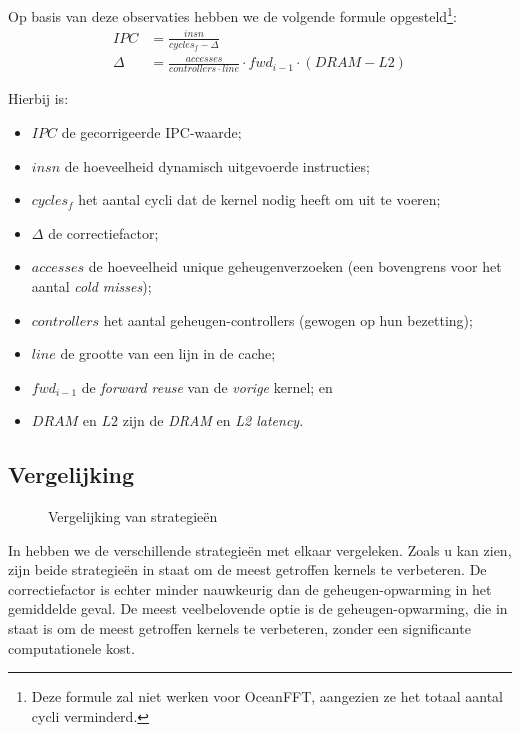 \documentclass[5p,numvwe]{elsarticle}
\begin{document}
    Op basis van deze observaties hebben we de volgende formule opgesteld\footnote{Deze formule zal niet werken voor OceanFFT, aangezien ze het totaal aantal cycli verminderd.}:
    \begin{align}
        IPC &= \frac{insn}{cycles_f - \Delta} \\
        \Delta &= \frac{accesses}{controllers \cdot line} \cdot fwd_{i-1} \cdot (DRAM - L2)
    \end{align}

    Hierbij is:
    \begin{itemize}
        \item $IPC$ de gecorrigeerde IPC-waarde;
        \item $insn$ de hoeveelheid dynamisch uitgevoerde instructies;
        \item $cycles_f$ het aantal cycli dat de kernel nodig heeft om uit te voeren;
        \item $\Delta$ de correctiefactor;
        \item $accesses$ de hoeveelheid unique geheugenverzoeken (een bovengrens voor het aantal \textit{cold misses});
        \item $controllers$ het aantal geheugen-controllers (gewogen op hun bezetting);
        \item $line$ de grootte van een lijn in de cache;
        \item $fwd_{i-1}$ de \textit{forward reuse} van de \textit{vorige} kernel; en
        \item $DRAM$ en $L2$ zijn de \textit{DRAM} en \textit{L2 latency}.
    \end{itemize}

    \subsection{Vergelijking}\label{subsec:inp-vergelijk}
    \begin{figure}[hb]
        \centering
        \caption{Vergelijking van strategieën}
        \label{fig:mitig-compare}
    \end{figure}

    In  hebben we de verschillende strategieën met elkaar vergeleken.
    Zoals u kan zien, zijn beide strategieën in staat om de meest getroffen kernels te verbeteren.
    De correctiefactor is echter minder nauwkeurig dan de geheugen-opwarming in het gemiddelde geval.
    De meest veelbelovende optie is de geheugen-opwarming, die in staat is om de meest getroffen kernels te verbeteren, zonder een significante computationele kost.
\end{document}
